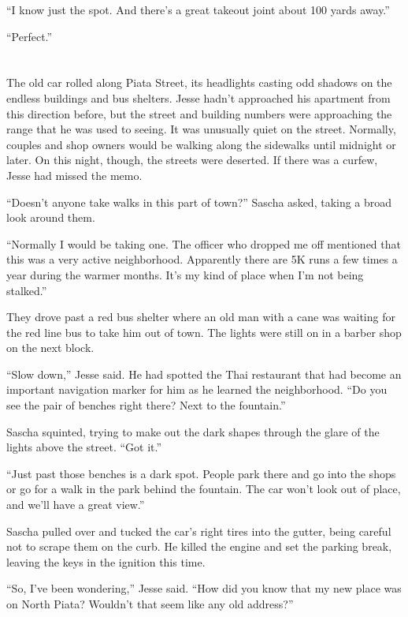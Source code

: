 \documentclass[12pt]{book}
\begin{document}
``I know just the spot.  And there's a great takeout joint about 100 yards away.''

``Perfect.''

\chapter{}

The old car rolled along Piata Street, its headlights casting odd shadows on the endless buildings and bus shelters.  Jesse hadn't approached his apartment from this direction before, but the street and building numbers were approaching the range that he was used to seeing.  It was unusually quiet on the street.  Normally, couples and shop owners would be walking along the sidewalks until midnight or later.  On this night, though, the streets were deserted.  If there was a curfew, Jesse had missed the memo.

``Doesn't anyone take walks in this part of town?'' Sascha asked, taking a broad look around them.

``Normally I would be taking one.  The officer who dropped me off mentioned that this was a very active neighborhood.  Apparently there are 5K runs a few times a year during the warmer months.  It's my kind of place when I'm not being stalked.''

They drove past a red bus shelter where an old man with a cane was waiting for the red line bus to take him out of town.  The lights were still on in a barber shop on the next block.

``Slow down,'' Jesse said.  He had spotted the Thai restaurant that had become an important navigation marker for him as he learned the neighborhood.  ``Do you see the pair of benches right there?  Next to the fountain.''

Sascha squinted, trying to make out the dark shapes through the glare of the lights above the street.  ``Got it.''

``Just past those benches is a dark spot.  People park there and go into the shops or go for a walk in the park behind the fountain.  The car won't look out of place, and we'll have a great view.''

Sascha pulled over and tucked the car's right tires into the gutter, being careful not to scrape them on the curb.  He killed the engine and set the parking break, leaving the keys in the ignition this time.

``So, I've been wondering,'' Jesse said.  ``How did you know that my new place was on North Piata?  Wouldn't that seem like any old address?''
\end{document}
